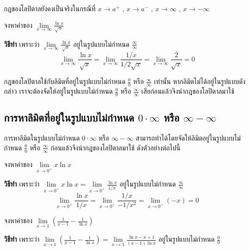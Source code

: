 \documentclass[
]{book}
\begin{document}
กฎของโลปิตาลยังคงเป็นจริงในกรณีที่ \(x\to a^+\) , \(x\to a^-\) ,
\(x\to \infty\) , \(x\to -\infty\)

จงหาค่าของ
\(\displaystyle \mathop {\lim }\limits_{x\to \infty } \frac{\ln
x}{\sqrt x }\)

\textbf{วิธีทำ} เพราะว่า
\(\displaystyle \mathop {\lim }\limits_{x\to \infty } \frac{\ln
x}{\sqrt x
}\) อยู่ในรูปแบบไม่กำหนด \(\displaystyle \frac{\infty }{\infty }\)
\[\displaystyle \mathop {\lim }\limits_{x\to \infty } \frac{\ln x}{\sqrt x 
}=\mathop {\lim 
}\limits_{x\to \infty } \frac{1/x}{1/2\sqrt x }=\mathop {\lim }\limits_{x\to 
\infty } \frac{2}{\sqrt x }=0\]

กฎของโลปิตาลใช้กับลิมิตที่อยู่ในรูปแบบไม่กำหนด \(\displaystyle \frac{0}{0}\) หรือ
\(\displaystyle \frac{\infty }{\infty }\) เท่านั้น
หากลิมิตไม่ได้อยู่ในรูปแบบดังกล่าว เราจะต้องจัดให้อยู่ในรูปแบบไม่กำหนด
\(\displaystyle \frac{0}{0}\) หรือ \(\displaystyle \frac{\infty
}{\infty }\) เสียก่อนแล้วจึงนำกฎของโลปิตาลมาใช้

\subsection{\texorpdfstring{การหาลิมิตที่อยู่ในรูปแบบไม่กำหนด \(0\cdot \infty\)
หรือ \(\infty
-\infty\)}{การหาลิมิตที่อยู่ในรูปแบบไม่กำหนด 0\textbackslash cdot \textbackslash infty หรือ \textbackslash infty
-\textbackslash infty}}\label{uxe01uxe32uxe23uxe2buxe32uxe25uxe21uxe15uxe17uxe2duxe22uxe43uxe19uxe23uxe1buxe41uxe1auxe1auxe44uxe21uxe01uxe33uxe2buxe19uxe14-0cdot-infty-uxe2buxe23uxe2d-infty--infty}

การหาลิมิตในรูปแบบไม่กำหนด \(0\cdot \infty\) หรือ \(\infty -\infty\)
สามารถทำได้โดยจัดให้ลิมิตอยู่ในรูปแบบไม่กำหนด \(\displaystyle \frac{0}{0}\) หรือ
\(\displaystyle \frac{\infty }{\infty }\) ก่อนแล้วจึงนำกฎของโลปิตาลมาใช้
ดังตัวอย่างต่อไปนี้

จงหาค่าของ \(\mathop {\lim }\limits_{x\to 0^+} x\ln x\)

\textbf{วิธีทำ} เพราะว่า
\(\displaystyle \mathop {\lim }\limits_{x\to 0^+} x\ln x=\mathop
{\lim
}\limits_{x\to 0^+} \frac{\ln x}{1/x}\) อยู่ในรูปแบบไม่กำหนด \(\displaystyle
\frac{\infty
}{\infty }\)
\[\displaystyle \mathop {\lim }\limits_{x\to 0^+} \frac{\ln x}{1/x}=\mathop 
{\lim 
}\limits_{x\to 0^+} \frac{1/x}{-1/x^2}=\mathop {\lim }\limits_{x\to 0^+} 
(-x)=0\]

จงหาค่าของ \(\displaystyle \mathop {\lim }\limits_{x\to 1}
(\frac{1}{x-1}-\frac{1}{\ln x})\)

\textbf{วิธีทำ} เพราะว่า \(\displaystyle \mathop {\lim }\limits_{x\to 1}
(\frac{1}{x-1}-\frac{1}{\ln
x})=\mathop {\lim }\limits_{x\to 1} \frac{\ln x-x+1}{(x-1)\ln x}\)
อยู่ในรูปแบบไม่กำหนด \(\displaystyle \frac{0}{0}\)
\end{document}
